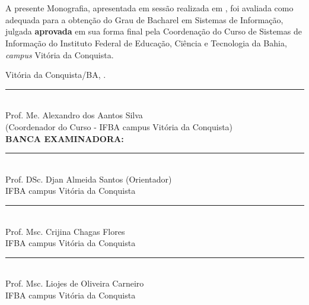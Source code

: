 

  \clearpage\newpage\pagebreak%
  \pagestyle{plain}
  \begin{center}%
    \textbf{\Large \@Titulo  }\\%
    \vspace{1.2cm}%
    \MakeUppercase{\textbf{\Large \@Autor}}\\%
  \end{center}%
  \vspace{0.6cm}%

  A presente Monografia, apresentada em sessão realizada em \textbf{ \@DataDefesa}, foi avaliada como adequada para a obtenção do Grau de Bacharel em Sistemas de Informação, julgada \textbf{aprovada} em sua forma final pela Coordenação do Curso de Sistemas de Informação do Instituto Federal de Educação, Ciência e Tecnologia da Bahia, \textit{campus} Vitória da Conquista.

  \begin{center}
    
    \vspace{7mm}
    Vitória da Conquista/BA, \@DataDefesa.
    \vspace{7mm}
    \vspace{7mm}
    \rule[0cm]{10cm}{0,5mm}\\
    \textbf{}
    Prof. Me. Alexandro dos Aantos Silva\\
    (Coordenador do Curso - IFBA campus Vitória da Conquista)\\
    \vspace{7mm}
    \textbf{\small BANCA EXAMINADORA:}\par
    \vspace{7mm}
    \rule[0cm]{10cm}{0,5mm}\\
    Prof. DSc. Djan Almeida Santos (Orientador)\\
    IFBA campus Vitória da Conquista\\
    \vspace{7mm}
    \rule[0cm]{10cm}{0,5mm}\\
    Prof. Msc. Crijina Chagas Flores\\
    IFBA campus Vitória da Conquista\\

    \vspace{7mm}
    \rule[0cm]{10cm}{0,5mm}\\
    Prof. Msc. Liojes de Oliveira Carneiro\\
    IFBA campus Vitória da Conquista\\
    
  \end{center}
  
  
